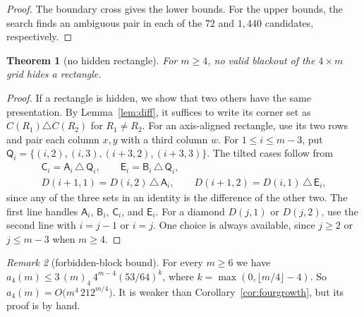 \documentclass[12pt]{article}
\theoremstyle{plain}
\newtheorem{theorem}{Theorem}
\theoremstyle{definition}
\theoremstyle{remark}
\newtheorem{remark}[theorem]{Remark}
\newcommand{\kA}{\mathsf{A}}
\newcommand{\kB}{\mathsf{B}}
\newcommand{\kC}{\mathsf{C}}
\newcommand{\kE}{\mathsf{E}}
\begin{document}
\begin{proof}
The boundary cross gives the lower bounds. For the upper bounds,
the search finds an ambiguous pair in each of the $72$ and $1{,}440$
candidates, respectively.
\end{proof}

\begin{theorem}[no hidden rectangle]\label{thm:hidden}
For $m\ge4$, no valid blackout of the $4\times m$ grid hides a rectangle.
\end{theorem}

\begin{proof}
If a rectangle is hidden, we show that two others have the same presentation.
By Lemma~\ref{lem:diff}, it suffices to write its corner set as
$C(R_1)\triangle C(R_2)$ for $R_1\ne R_2$.
For an axis-aligned rectangle, use its two rows and pair each column
$x,y$ with a third column $w$.
For $1\le i\le m-3$, put
$\mathsf Q_i=\{(i,2),(i,3),(i+3,2),(i+3,3)\}$. The tilted cases follow from
\begin{equation}\label{eq:fourxor}
\begin{gathered}
\kC_i=\kA_i\,\triangle\,\mathsf Q_i,\qquad \kE_i=\kB_i\,\triangle\,\mathsf Q_i,\\
D(i+1,1)=D(i,2)\,\triangle\,\kA_i,\qquad D(i+1,2)=D(i,1)\,\triangle\,\kE_i,
\end{gathered}
\end{equation}
since any of the three sets in an identity is the difference of the
other two. The first line handles $\kA_i$, $\kB_i$, $\kC_i$, and $\kE_i$.
For a diamond $D(j,1)$ or $D(j,2)$, use the second line with $i=j-1$
or $i=j$. One choice is always available, since $j\ge2$ or
$j\le m-3$ when $m\ge4$.
\end{proof}

\begin{remark}[forbidden-block bound]\label{thm:foursurvival}
For every $m\ge6$ we have $a_4(m)\le3\,(m)_4\,4^{m-4}(53/64)^k$, where
$k=\max(0,\lfloor m/4\rfloor-4)$. So $a_4(m)=O\bigl(m^4\,212^{m/4}\bigr)$.
It is weaker than Corollary~\ref{cor:fourgrowth}, but its proof is by hand.
\end{remark}
\end{document}
